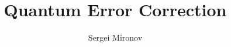 \documentclass{article}
\title{Quantum Error Correction}
\author{Sergei Mironov}
\begin{document}
\vsp

\makeatletter
\begin{center}
  \LARGE \bfseries \@title
\end{center}
\makeatother


\tableofcontents



\printbibliography
\end{document}
